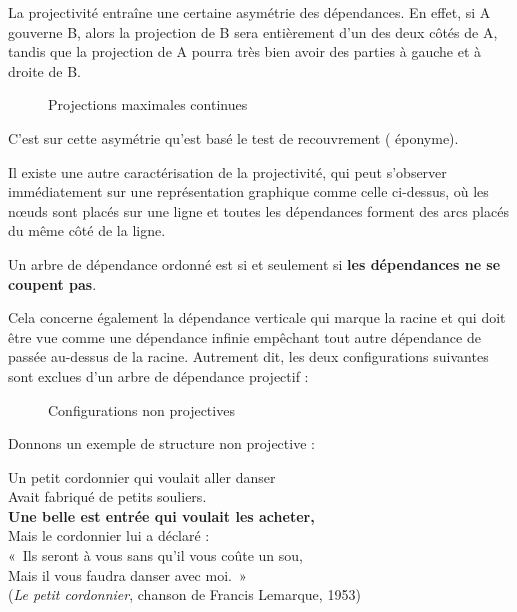 La projectivité entraîne une certaine asymétrie des dépendances. En effet, si A gouverne B, alors la projection de B sera entièrement d’un des deux côtés de A, tandis que la projection de A pourra très bien avoir des parties à gauche et à droite de B.

\begin{figure}

\caption{\label{fig:}Projections maximales continues}

\end{figure}

C’est sur cette asymétrie qu’est basé le test de recouvrement ( éponyme).

Il existe une autre caractérisation de la projectivité, qui peut s’observer immédiatement sur une représentation graphique comme celle ci-dessus, où les nœuds sont placés sur une ligne et toutes les dépendances forment des arcs placés du même côté de la ligne.

\begin{styleLivreImportant}
Un arbre de dépendance ordonné est  si et seulement si \textbf{les dépendances ne se coupent pas}.
\end{styleLivreImportant}

Cela concerne également la dépendance verticale qui marque la racine et qui doit être vue comme une dépendance infinie empêchant tout autre dépendance de passée au-dessus de la racine. Autrement dit, les deux configurations suivantes sont exclues d’un arbre de dépendance projectif :

\begin{figure}

\caption{\label{fig:}Configurations non projectives}

\end{figure}

Donnons un exemple de structure non projective :

\ea
Un petit cordonnier qui voulait aller danser\\
Avait fabriqué de petits souliers.\\
\textbf{Une belle est entrée qui voulait les acheter,}\\
Mais le cordonnier lui a déclaré :\\
«~Ils seront à vous sans qu’il vous coûte un sou,\\
Mais il vous faudra danser avec moi.~»\\
(\textit{Le petit cordonnier}, chanson de Francis Lemarque, 1953)
\z

